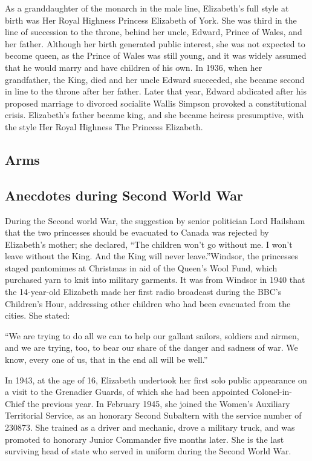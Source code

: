 \documentclass[11pt;a4paper]{article}
\begin{document}
As a granddaughter of the monarch in the male line, Elizabeth's full style at birth was Her Royal Highness Princess Elizabeth of York. She was third in the line of succession to the throne, behind her uncle, Edward, Prince of Wales, and her father. Although her birth generated public interest, she was not expected to become queen, as the Prince of Wales was still young, and it was widely assumed that he would marry and have children of his own. In 1936, when her grandfather, the King, died and her uncle Edward succeeded, she became second in line to the throne after her father. Later that year, Edward abdicated after his proposed marriage to divorced socialite Wallis Simpson provoked a constitutional crisis. Elizabeth's father became king, and she became heiress presumptive, with the style Her Royal Highness The Princess Elizabeth. 

\subsection*{Arms}

\newpage

\subsection*{Anecdotes during Second World War}

During the Second world War, the suggestion by senior politician Lord Hailsham that the two princesses should be evacuated to Canada was rejected by Elizabeth's mother; she declared, ``The children won't go without me. I won't leave without the King. And the King will never leave.''Windsor, the princesses staged pantomimes at Christmas in aid of the Queen's Wool Fund, which purchased yarn to knit into military garments. It was from Windsor in 1940 that the 14-year-old Elizabeth made her first radio broadcast during the BBC's Children's Hour, addressing other children who had been evacuated from the cities. She stated:

``We are trying to do all we can to help our gallant sailors, soldiers and airmen, and we are trying, too, to bear our share of the danger and sadness of war. We know, every one of us, that in the end all will be well.''

In 1943, at the age of 16, Elizabeth undertook her first solo public appearance on a visit to the Grenadier Guards, of which she had been appointed Colonel-in-Chief the previous year. In February 1945, she joined the Women's Auxiliary Territorial Service, as an honorary Second Subaltern with the service number of 230873. She trained as a driver and mechanic, drove a military truck, and was promoted to honorary Junior Commander five months later. She is the last surviving head of state who served in uniform during the Second World War.
\end{document}
